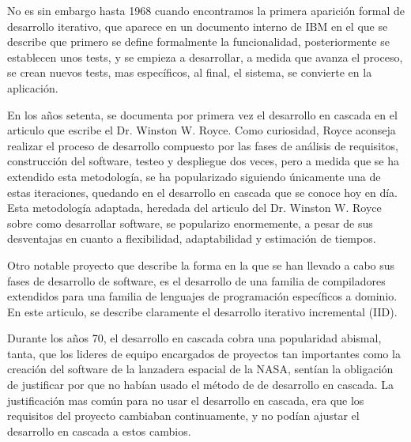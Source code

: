 \documentclass[12pt]{report} %
\begin{document}
No es sin embargo hasta 1968 cuando encontramos la primera aparición formal de
desarrollo iterativo, que aparece en un documento interno de IBM en el que se
describe que primero se define formalmente la funcionalidad, posteriormente se
establecen unos tests, y se empieza a desarrollar, a medida que avanza el
proceso, se crean nuevos tests, mas específicos, al final, el sistema, se
convierte en la aplicación. \cite{ID-FB}

En los años setenta, se documenta por primera vez el desarrollo en cascada en el
articulo que escribe el Dr. Winston W. Royce.  Como curiosidad, Royce aconseja
realizar el proceso de desarrollo compuesto por las fases de análisis de
requisitos, construcción del software, testeo y despliegue dos veces, pero a
medida que se ha extendido esta metodología, se ha popularizado siguiendo
únicamente una de estas iteraciones, quedando en el desarrollo en cascada que se
conoce hoy en día. \cite{royce1970} Esta metodología adaptada, heredada del
articulo del Dr. Winston W. Royce sobre como desarrollar software, se popularizo
enormemente, a pesar de sus desventajas en cuanto a flexibilidad, adaptabilidad
y estimación de tiempos.

Otro notable proyecto que describe la forma en la que se han llevado a cabo sus
fases de desarrollo de software, es el desarrollo de una familia de compiladores
extendidos para una familia de lenguajes de programación específicos a dominio.
En este articulo, se describe claramente el desarrollo iterativo incremental
(IID). \cite{6312870}

Durante los años 70, el desarrollo en cascada cobra una popularidad abismal,
tanta, que los lideres de equipo encargados de proyectos tan importantes como la
creación del software de la lanzadera espacial de la NASA, sentían la obligación
de justificar por que no habían usado el método de de desarrollo en cascada.  La
justificación mas común para no usar el desarrollo en cascada, era que los
requisitos del proyecto cambiaban continuamente, y no podían ajustar el
desarrollo en cascada a estos cambios.
\end{document}
